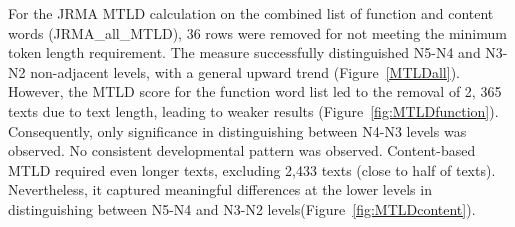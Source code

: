 
For the JRMA MTLD calculation on the combined list of function and content words (JRMA_all_MTLD), 36 rows were removed
for not
meeting the minimum token length requirement. The measure successfully distinguished N5-N4 and N3-N2 non-adjacent
levels, with a
general upward trend (Figure~\ref{MTLDall}). However, the MTLD score for the function word list led to the removal of 2,
365
texts due to
text length, leading to weaker results (Figure~\ref{fig:MTLDfunction}). Consequently, only significance in
distinguishing
between N4-N3
levels was observed. No consistent developmental pattern was observed. Content-based MTLD required even longer
texts, excluding 2,433 texts (close to half of texts). Nevertheless, it captured meaningful differences at the lower 
levels in distinguishing between N5-N4 and N3-N2 levels(Figure~\ref{fig:MTLDcontent}). 


